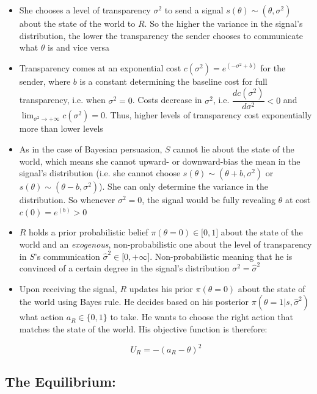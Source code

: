 \documentclass[paper=a4,12pt,DIV=11,twoside=false]{scrartcl}
\begin{document}
\begin{itemize}
\item She chooses a level of transparency $\sigma^2$ to send a signal $s(\theta)\sim(\theta, \sigma^2)$ about the state of the world to $R$. So the higher the variance in the signal's distribution, the lower the transparency the sender chooses to communicate what $\theta$ is and vice versa
\item Transparency comes at an exponential cost $c(\sigma^2) = e^{(-\sigma^2 + b)}$ for the sender, where $b$ is a constant determining the baseline cost for full transparency, i.e. when $\sigma^2=0$. Costs decrease in $\sigma^2$, i.e. $\dfrac{dc(\sigma^2)}{d\sigma^2} < 0$ and $\lim_{\sigma^2 \to +\infty} c(\sigma^2) = 0$. Thus, higher levels of transparency cost exponentially more than lower levels
\item As in the case of Bayesian persuasion, $S$ cannot lie about the state of the world, which means she cannot upward- or downward-bias the mean in the signal's distribution (i.e. she cannot choose $s(\theta)\sim(\theta+b, \sigma^2)$ or $s(\theta)\sim(\theta-b, \sigma^2)$). She can only determine the variance in the distribution. So whenever $\sigma^2=0$, the signal would be fully revealing $\theta$ at cost $c(0)= e^{(b)}>0$
\item $R$ holds a prior probabilistic belief $\pi(\theta=0)\in \big[0,1\big]$ about the state of the world and an \textit{exogenous}, non-probabilistic one about the level of transparency in $S$'s communication $\hat{\sigma}^2\in \big[0,+\infty\big]$. Non-probabilistic meaning that he is convinced of a certain degree in the signal's distribution $\sigma^2 = \hat{\sigma}^2$
\item Upon receiving the signal, $R$ updates his prior $\pi(\theta=0)$ about the state of the world using Bayes rule. He decides based on his posterior $\pi(\theta=1|s, \hat{\sigma}^2)$ what action $a_R \in \{0,1\}$ to take. He wants to choose the right action that matches the state of the world. His objective function is therefore: 

\begin{equation}
U_R = -(a_R - \theta)^2
\end{equation}
\end{itemize}

\subsection{The Equilibrium:}
\end{document}
